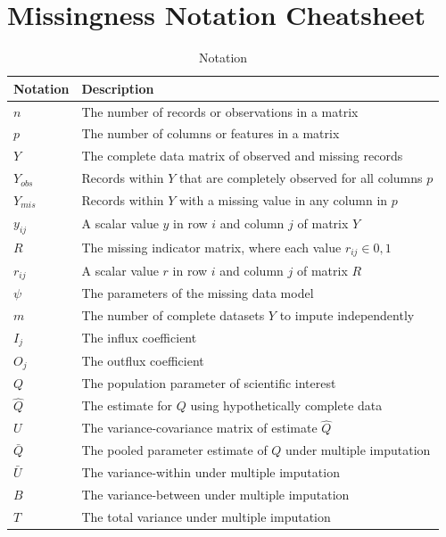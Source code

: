 \documentclass[12pt,oneside]{chicagocapstone}
\begin{document}
\chapter{Missingness Notation
Cheatsheet}\label{missingness-notation-cheatsheet}
\begin{longtabu} to 
\caption{\label{tab:appendixbnotation}Notation}\\
\toprule
\begingroup\fontsize{13}{15}\selectfont \textbf{Notation}\endgroup & \begingroup\fontsize{13}{15}\selectfont \textbf{Description}\endgroup\\
\midrule
$n$ & The number of records or observations in a matrix\\
$p$ & The number of columns or features in a matrix\\
$Y$ & The complete data matrix of observed and missing records\\
$Y_{obs}$ & Records within $Y$ that are completely observed for all columns $p$\\
$Y_{mis}$ & Records within $Y$ with a missing value in any column in $p$\\
\addlinespace
$y_{ij}$ & A scalar value $y$ in row $i$ and column $j$ of matrix $Y$\\
$R$ & The missing indicator matrix, where each value $r_{ij} \in 0,1$\\
$r_{ij}$ & A scalar value $r$ in row $i$ and column $j$ of matrix $R$\\
$\psi$ & The parameters of the missing data model\\
$m$ & The number of complete datasets $Y$ to impute independently\\
\addlinespace
$I_j$ & The influx coefficient\\
$O_j$ & The outflux coefficient\\
$Q$ & The population parameter of scientific interest\\
$\hat Q$ & The estimate for $Q$ using hypothetically complete data\\
$U$ & The variance-covariance matrix of estimate $\hat Q$\\
\addlinespace
$\bar Q$ & The pooled parameter estimate of $Q$ under multiple imputation\\
$\bar U$ & The variance-within under multiple imputation\\
$B$ & The variance-between under multiple imputation\\
$T$ & The total variance under multiple imputation\\
\bottomrule
\end{longtabu}
\end{document}
